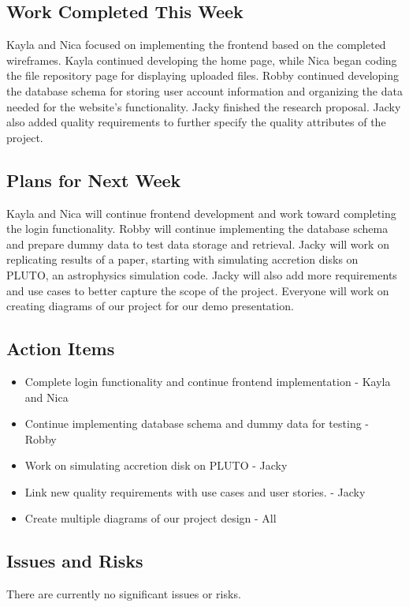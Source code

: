 \subsection{Work Completed This Week}
Kayla and Nica focused on implementing the frontend based on the completed wireframes. Kayla continued developing the home page, while Nica began coding the file repository page for displaying uploaded files. Robby continued developing the database schema for storing user account information and organizing the data needed for the website's functionality. Jacky finished the research proposal. Jacky also added quality requirements to further specify the quality attributes of the project. 

\subsection{Plans for Next Week}
Kayla and Nica will continue frontend development and work toward completing the login functionality. Robby will continue implementing the database schema and prepare dummy data to test data storage and retrieval. Jacky will work on replicating results of a paper, starting with simulating accretion disks on PLUTO, an astrophysics simulation code. Jacky will also add more requirements and use cases to better capture the scope of the project. Everyone will work on creating diagrams of our project for our demo presentation.

\subsection{Action Items}
\begin{itemize}
    \item Complete login functionality and continue frontend implementation - Kayla and Nica
    \item Continue implementing database schema and dummy data for testing - Robby
    \item Work on simulating accretion disk on PLUTO - Jacky
    \item Link new quality requirements with use cases and user stories. - Jacky
    \item Create multiple diagrams of our project design - All

\end{itemize}

\subsection{Issues and Risks}
There are currently no significant issues or risks.

